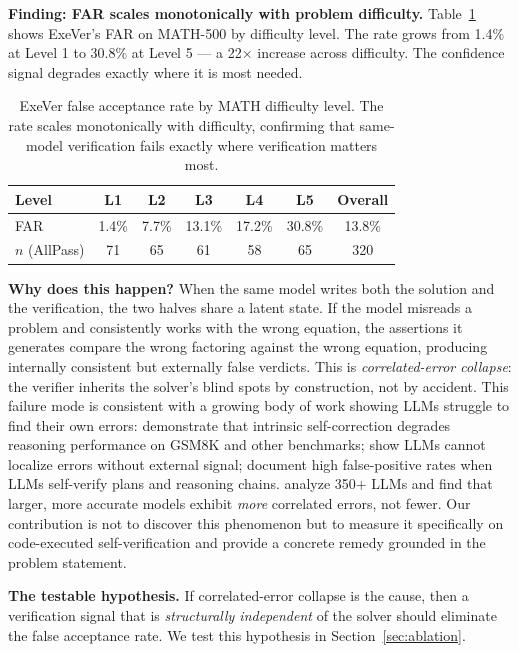 \documentclass{article}
\begin{document}
\textbf{Finding: FAR scales monotonically with problem difficulty.} Table~\ref{tab:collapse} shows ExeVer's FAR on MATH-500 by difficulty level. The rate grows from 1.4\% at Level 1 to 30.8\% at Level 5 --- a 22$\times$ increase across difficulty. The confidence signal degrades exactly where it is most needed.

\begin{table}[t]
\centering
\caption{ExeVer false acceptance rate by MATH difficulty level. The rate scales monotonically with difficulty, confirming that same-model verification fails exactly where verification matters most.}
\label{tab:collapse}
\small
\begin{tabular}{lcccccc}
\toprule
Level & L1 & L2 & L3 & L4 & L5 & Overall \\
\midrule
FAR & 1.4\% & 7.7\% & 13.1\% & 17.2\% & 30.8\% & 13.8\% \\
$n$ (AllPass) & 71 & 65 & 61 & 58 & 65 & 320 \\
\bottomrule
\end{tabular}
\end{table}

\textbf{Why does this happen?} When the same model writes both the solution and the verification, the two halves share a latent state. If the model misreads a problem and consistently works with the wrong equation, the assertions it generates compare the wrong factoring against the wrong equation, producing internally consistent but externally false verdicts. This is \emph{correlated-error collapse}: the verifier inherits the solver's blind spots by construction, not by accident. This failure mode is consistent with a growing body of work showing LLMs struggle to find their own errors: \citet{huang2024selfcorrect} demonstrate that intrinsic self-correction degrades reasoning performance on GSM8K and other benchmarks; \citet{tyen2024llm} show LLMs cannot localize errors without external signal; \citet{stechly2024selfverify} document high false-positive rates when LLMs self-verify plans and reasoning chains. \citet{kim2025correlated} analyze 350+ LLMs and find that larger, more accurate models exhibit \emph{more} correlated errors, not fewer. Our contribution is not to discover this phenomenon but to measure it specifically on code-executed self-verification and provide a concrete remedy grounded in the problem statement.

\textbf{The testable hypothesis.} If correlated-error collapse is the cause, then a verification signal that is \emph{structurally independent} of the solver should eliminate the false acceptance rate. We test this hypothesis in Section~\ref{sec:ablation}.
\end{document}

